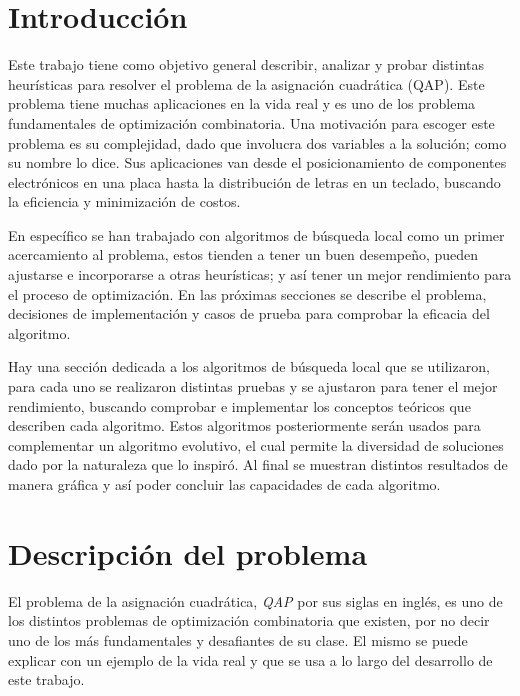 
\section*{Introducción}

Este trabajo tiene como objetivo general describir, analizar y probar distintas heurísticas para resolver el problema de la asignación cuadrática (QAP). Este problema tiene muchas aplicaciones en la vida real y es uno de los problema fundamentales de optimización combinatoria. Una motivación para escoger este problema es su complejidad, dado que involucra dos variables a la solución; como su nombre lo dice. Sus aplicaciones van desde el posicionamiento de componentes electrónicos en una placa hasta la distribución de letras en un teclado, buscando la eficiencia y minimización de costos. 

En específico se han trabajado con algoritmos de búsqueda local como un primer acercamiento al problema, estos tienden a tener un buen desempeño, pueden ajustarse e incorporarse a otras heurísticas; y así tener un mejor rendimiento para el proceso de optimización. En las próximas secciones se describe el problema, decisiones de implementación y casos de prueba para comprobar la eficacia del algoritmo.

Hay una sección dedicada a los algoritmos de búsqueda local que se utilizaron, para cada uno se realizaron distintas pruebas y se ajustaron para tener el mejor rendimiento, buscando comprobar e implementar los conceptos teóricos que describen cada algoritmo. Estos algoritmos posteriormente serán usados para complementar un algoritmo evolutivo, el cual permite la diversidad de soluciones dado por la naturaleza que lo inspiró. Al final se muestran distintos resultados de manera gráfica y así poder concluir las capacidades de cada algoritmo.

\newpage

\section*{Descripción del problema}

El problema de la asignación cuadrática, \textit{QAP} por sus siglas en inglés, es uno de los distintos problemas de optimización combinatoria que existen, por no decir uno de los más fundamentales y desafiantes de su clase. El mismo se puede explicar con un ejemplo de la vida real y que se usa a lo largo del desarrollo de este trabajo.

